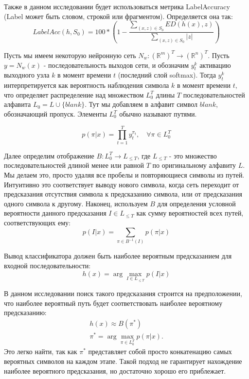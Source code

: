 Также в данном исследовании будет использоваться метрика LabelAccuracy (Label может быть словом, строкой или фрагментом). Определяется она так:
\begin{equation}
	LabelAcc(h, S_0) = 100 * (1 - \frac{\sum_{(x,z) \in S_0} ED(h(x), z)}{\sum_{(x,z) \in S_0} |z|})
\end{equation}


Пусть мы имеем некоторую нейронную сеть $N_w : (\mathbb{R}^m)^T \rightarrow (\mathbb{R}^n)^T$. Пусть $y = N_w(x)$ - последовательность выходов сети, и обозначим $y_t^k$ активацию выходного узла $k$ в момент времени $t$ (последний слой softmax). Тогда $y_t^k$ интерпретируется как вероятность наблюдения символа $k$ в момент времени $t$, что определяет распределение над множеством $L_{0}^T$ длины $T$ последовательностей алфавита $L_0 = L \cup \{blank\}$. Тут мы добавляем в алфавит символ $blank$, обозначающий пропуск. Элементы $L_0^T$ обычно называют путями.

\begin{equation}
	p(\pi|x) = \prod_{t=1}^{T} y_t^{\pi_t}, \quad \forall \pi \in L_{0}^{T}
\end{equation}

Далее определим отображение $B: L_{0}^T \rightarrow L_{\leq T}$, где $L_{\leq T}$ - это множество последовательностей длиной менее или равной $T$ по оригинальному алфавиту $L$. Мы делаем это, просто удаляя все пробелы и повторяющиеся символы из путей. Интуитивно это соответствует выводу нового символа, когда сеть переходит от предсказания отсутствия символа к предсказанию символа, или от предсказания одного символа к другому. Наконец, используем $B$ для определения условной вероятности данного предсказания $I \in L_{\leq T}$ как сумму вероятностей всех путей, соответствующих ему:
\begin{equation}
	p(I|x) = \sum_{\pi \in B^{-1}(I)} p(\pi|x)
\end{equation}

Вывод классификатора должен быть наиболее вероятным предсказанием для входной последовательности:
\begin{equation}
	h(x) = \arg\max_{I \in L_{\leq T}} p(I|x)
\end{equation}

В данном исследовании поиск такого предсказания строится на предположении, что наиболее вероятный путь будет соответствовать наиболее вероятному предсказанию:
\begin{equation}
\begin{split}
	h(x) \approx B(\pi^{*}) \\
	\pi^{*} = \arg\max_{\pi \in L_0^T} p(\pi|x).
\end{split}
\end{equation}
Это легко найти, так как $\pi^{*}$ представляет собой просто конкатенацию самых вероятных символов на каждом этапе. Такой подход не гарантирует нахождение наиболее вероятного предсказания, но достаточно хорошо его приблежает. 

